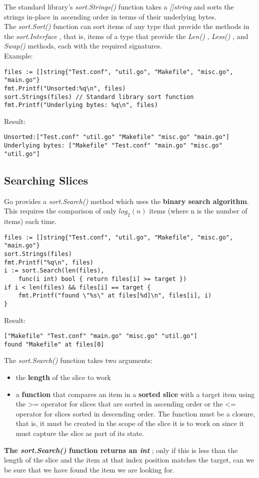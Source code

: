 \documentclass[10pt,letterpaper]{report}
\begin{document}
The standard library's \textit{sort.Strings()} function takes a \textit{[]string} and sorts the strings in-place in ascending order in terms of their underlying bytes.\\
The \textit{sort.Sort()} function can sort items of any type that provide the methods in the \textit{sort.Interface} , that is, items of a type that provide the \textit{Len()} , \textit{Less()} , and \textit{Swap()} methods, each with the required signatures.\\
Example:
\begin{lstlisting}
files := []string{"Test.conf", "util.go", "Makefile", "misc.go", "main.go"}
fmt.Printf("Unsorted:%q\n", files)
sort.Strings(files) // Standard library sort function
fmt.Printf("Underlying bytes: %q\n", files)
\end{lstlisting}
Result:
\begin{lstlisting}
Unsorted:["Test.conf" "util.go" "Makefile" "misc.go" "main.go"]
Underlying bytes: ["Makefile" "Test.conf" "main.go" "misc.go" "util.go"]
\end{lstlisting}
\subsection{Searching Slices}
Go provides a \textit{sort.Search()} method which uses the \textbf{binary search algorithm}. This requires the comparison of only $log_{2}(n)$ items (where n is the number of items) each time.
\begin{lstlisting}
files := []string{"Test.conf", "util.go", "Makefile", "misc.go", "main.go"}
sort.Strings(files)
fmt.Printf("%q\n", files)
i := sort.Search(len(files),
	func(i int) bool { return files[i] >= target })
if i < len(files) && files[i] == target {
	fmt.Printf("found \"%s\" at files[%d]\n", files[i], i)
}
\end{lstlisting}
Result:
\begin{lstlisting}
["Makefile" "Test.conf" "main.go" "misc.go" "util.go"]
found "Makefile" at files[0]
\end{lstlisting}
The \textit{sort.Search()} function takes two arguments:
\begin{itemize}
\item the \textbf{length} of the slice to work
\item a \textbf{function} that compares an item in a \textbf{sorted slice} with a target item using the >= operator for slices that are sorted in ascending order or the <= operator for slices sorted in descending order. The function must be a closure, that is, it must be created in the scope of the slice it is to work on since it must capture the slice as part of its state.
\end{itemize}
\textbf{The \textit{sort.Search()} function returns an \textit{int}} ; only if this is less than the length of the slice and the item at that index position matches the target, can we be sure that we have found the item we are looking for.
\end{document}
